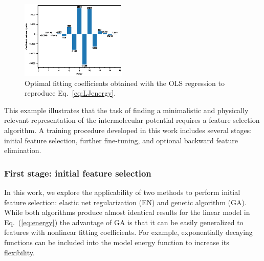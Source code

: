 \documentclass[aip,jcp,reprint,amsmath,amssymb,nature]{revtex4-1}
\begin{document}

\begin{figure}
\includegraphics[width=0.45\textwidth]{media/OLS_Bar.eps}
\caption{Optimal fitting coefficients obtained with the OLS regression to reproduce Eq.~\ref{eq:LJenergy}.} \label{Fig:OLS}
\end{figure}

This example illustrates that the task of finding a minimalistic and physically relevant representation of the intermolecular potential requires a feature selection algorithm. %
A training procedure developed in this work includes several stages: initial feature selection, further fine-tuning, and optional backward feature elimination.

\subsubsection{First stage: initial feature selection}

In this work, we explore the applicability of two methods to perform initial feature selection: elastic net regularization (EN) and genetic algorithm (GA). 
While both algorithms produce almost identical results for the linear model in Eq.~(\ref{eq:energy}) the advantage of GA is that it can be easily generalized to features with nonlinear fitting coefficients. 
For example, exponentially decaying functions can be included into the model energy function to increase its flexibility. 
\end{document}
